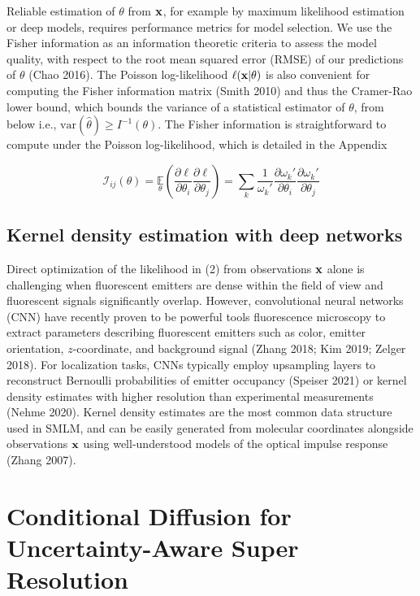 \documentclass{article}
\begin{document}
Reliable estimation of $\theta$ from $\bold{x}$, for example by maximum likelihood estimation or deep models, requires performance metrics for model selection. We use the Fisher information as an information theoretic criteria to assess the model quality, with respect to the root mean squared error (RMSE) of our predictions of $\theta$ (Chao 2016). The Poisson log-likelihood $\ell(\bold{x}|\theta)$ is also convenient for computing the Fisher information matrix (Smith 2010) and thus the Cramer-Rao lower bound, which bounds the variance of a statistical estimator of $\theta$, from below i.e., $\mathrm{var}(\hat{\theta}) \geq I^{-1}(\theta)$. The Fisher information is straightforward to compute under the Poisson log-likelihood, which is detailed in the Appendix

\begin{equation}
\mathcal{I}_{ij}(\theta) = \underset{\theta}{\mathbb{E}}\left(\frac{\partial \ell}{\partial\theta_{i}}\frac{\partial\ell}{\partial\theta_{j}}\right) = \sum_{k}\frac{1}{\omega_{k}'}\frac{\partial \omega_{k}'}{\partial\theta_{i}}\frac{\partial \omega_{k}'}{\partial\theta_{j}}
\end{equation}

\subsection{Kernel density estimation with deep networks}

Direct optimization of the likelihood in (2) from observations $\bold{x}$ alone is challenging when fluorescent emitters are dense within the field of view and fluorescent signals significantly overlap. However, convolutional neural networks (CNN) have recently proven to be powerful tools fluorescence microscopy to extract parameters describing fluorescent emitters such as color, emitter orientation, $z$-coordinate, and background signal (Zhang 2018; Kim 2019; Zelger 2018). For localization tasks, CNNs typically employ upsampling layers to reconstruct Bernoulli probabilities of emitter occupancy (Speiser 2021) or kernel density estimates with higher resolution than experimental measurements (Nehme 2020). Kernel density estimates are the most common data structure used in SMLM, and can be easily generated from molecular coordinates alongside observations $\bold{x}$ using well-understood models of the optical impulse response (Zhang 2007). 

\section{Conditional Diffusion for Uncertainty-Aware Super Resolution}
\end{document}
